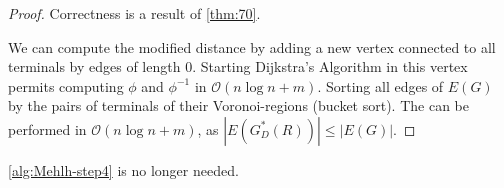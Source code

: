 \documentclass[../skript.tex]{subfiles}
\begin{document}
\begin{proof}
Correctness is a result of \cref{thm:70}.

We can compute the modified distance by adding a new vertex connected to all terminals by edges of length $0$. Starting Dijkstra's Algorithm in this vertex permits computing $\phi$ and $\phi^{-1}$ in $\mathcal{O}(n \log n + m)$.
Sorting all edges of $E(G)$ by the pairs of terminals of their Voronoi-regions (bucket sort).
The  can be performed in $\mathcal{O}(n \log n + m)$, as $|E(G_D^*(R))| \leq |E(G)|$.
\end{proof}
\begin{remark}
\cref{alg:Mehlh-step4} is no longer needed.
\end{remark}
\end{document}

